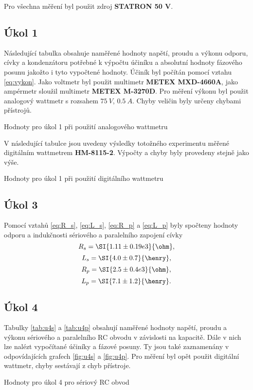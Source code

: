 \documentclass[0-protokol.tex]{subfiles}
\begin{document}
Pro všechna měření byl použit zdroj \textbf{STATRON 50 V}.

\subsection*{Úkol 1}
Následující tabulka obsahuje naměřené hodnoty napětí, proudu a výkonu odporu, cívky a kondenzátoru potřebné k výpočtu účiníku a absolutní hodnoty fázového posunu jakožto i tyto vypočtené hodnoty. Účiník byl počítán pomocí vztahu \eqref{eq:vykon}. Jako voltmetr byl použit multimetr \textbf{METEX MXD-4660A}, jako ampérmetr sloužil multimetr \textbf{METEX M-3270D}. Pro měření výkonu byl použit analogový wattmetr s rozsahem $\SI{75}{V}$, $\SI{0.5}{A}$. Chyby veličin byly určeny chybami přístrojů.
\begin{table}[H] 
\centering
\setlength{\tabcolsep}{8pt}

\caption{Hodnoty pro úkol 1 při použití analogového wattmetru}
\label{tab:u1a}
\end{table}

V následující tabulce jsou uvedeny výsledky totožného experimentu měřené digitálním wattmetrem \textbf{HM-8115-2}. Výpočty a chyby byly provedeny stejně jako výše.

\begin{table}[H] 
\centering
\setlength{\tabcolsep}{8pt}

\caption{Hodnoty pro úkol 1 při použití digitálního wattmetru}
\label{tab:u1d}
\end{table}

\subsection*{Úkol 3}
Pomocí vztahů \eqref{eq:R_s}, \eqref{eq:L_s}, \eqref{eq:R_p} a \eqref{eq:L_p} byly spočteny hodnoty odporu a indukčnosti sériového a paralelního zapojení cívky
$$ R_s = \SI{1.11 \pm 0.19 e3}{\ohm}, $$
$$ L_s = \SI{4.0 \pm 0.7}{\henry}, $$
$$ R_p = \SI{2.5 \pm 0.4 e3}{\ohm}, $$
$$ L_p = \SI{7.1 \pm 1.2}{\henry}. $$

\subsection*{Úkol 4}

Tabulky \ref{tab:u4s} a \ref{tab:u4p} obsahují naměřené hodnoty napětí, proudu a výkonu sériového a paralelního RC obvodu v závislosti na kapacitě. Dále v nich lze nalézt vypočítané účiníky a fázové posuny. Ty jsou také zaznamenány v odpovídajících grafech \ref{fig:u4s} a \ref{fig:u4p}. Pro měření byl opět použit digitální wattmetr, chyby sestávají z chyb přístroje.
\begin{table}[H] 
\centering
\setlength{\tabcolsep}{8pt}

\caption{Hodnoty pro úkol 4 pro sériový RC obvod}
\label{tab:u4s}
\end{table}
\end{document}
